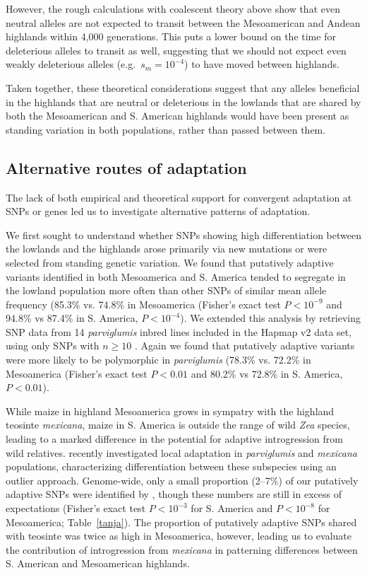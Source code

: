 However, the rough calculations with coalescent theory above show that even neutral alleles are not expected to transit between the Mesoamerican and Andean highlands within 4,000 generations.
This puts a lower bound on the time for deleterious alleles to transit as well, suggesting that we should not expect even weakly deleterious alleles (e.g.\ $s_m=10^{-4}$) to have moved between highlands.

Taken together, these theoretical considerations suggest that any alleles beneficial in the highlands that are neutral or deleterious in the lowlands that are shared by both the Mesoamerican and S. American highlands would have been present as standing variation in both populations, rather than passed between them.


\subsection*{Alternative routes of adaptation}
The lack of both empirical and theoretical support for convergent adaptation at SNPs or genes led us to investigate alternative patterns of adaptation. 

We first sought to understand whether SNPs showing high differentiation between the lowlands and the highlands arose primarily via new mutations or were selected from standing genetic variation.  
We found that putatively adaptive variants identified in both Mesoamerica and S. America tended to segregate in the lowland population more often than other SNPs of similar mean allele frequency (85.3\% vs. 74.8\% in Mesoamerica (Fisher's exact test $P < 10^{-9}$ and 94.8\% vs 87.4\% in S. America,  $P< 10^{-4}$).  
We extended this analysis by retrieving SNP data from 14 \emph{parviglumis} inbred lines included in the Hapmap v2 data set, using only SNPs with $n\geq10$ \cite[]{Chia_2012_22660545,Hufford_2012_22660546}.  
Again we found that putatively adaptive variants were more likely to be polymorphic in \emph{parviglumis} (78.3\% vs. 72.2\% in Mesoamerica 
(Fisher's exact test $P < 0.01$ and 80.2\% vs 72.8\% in S. America,  $P< 0.01$). 

While maize in highland Mesoamerica grows in sympatry with the highland teosinte \textit{mexicana}, maize in S. America is outside the range of wild \textit{Zea} species, leading to a marked difference in the potential for adaptive introgression from wild relatives.
\citet{Pyhajarvi2013} recently investigated local adaptation in \textit{parviglumis} and \textit{mexicana} populations, characterizing differentiation between these subspecies using an outlier approach.
Genome-wide, only a small proportion (2--7\%) of our putatively adaptive SNPs were identified by \citet{Pyhajarvi2013}, though these numbers are still in excess of expectations (Fisher's exact test $P<10^{-3}$ for S. America and $P<10^{-8}$ for Mesoamerica; Table~\ref{tanja}).
The proportion of putatively adaptive SNPs shared with teosinte was twice as high in Mesoamerica, however, 
leading us to evaluate the contribution of introgression  from \textit{mexicana} \cite[]{Profford_2013} in patterning differences between S. American and Mesoamerican highlands.  

